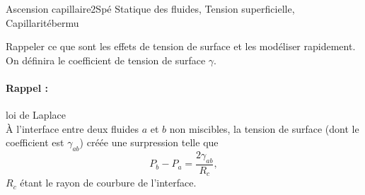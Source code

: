 
\begin{exercise}{Ascension capillaire}{2}{Spé}
{Statique des fluides, Tension superficielle, Capillarité}{bermu}

\begin{questions}
    \questioncours Rappeler ce que sont les effets de tension de surface et les modéliser rapidement. On définira le coefficient de tension de surface $\gamma$.
\begin{EnvUplevel}
\paragraph{Rappel :} loi de Laplace \\
\`A l'interface entre deux fluides $a$ et $b$ non miscibles, la tension de surface (dont le coefficient est $\gamma_{ab}$) créée une surpression telle que
$$P_b - P_a = \dfrac{2\gamma_{ab}}{R_c},$$
$R_c$ étant le rayon de courbure de l'interface.


\end{EnvUplevel}
\end{questions}
\end{exercise}
